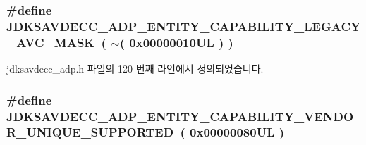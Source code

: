 \subsubsection[{\texorpdfstring{J\+D\+K\+S\+A\+V\+D\+E\+C\+C\+\_\+\+A\+D\+P\+\_\+\+E\+N\+T\+I\+T\+Y\+\_\+\+C\+A\+P\+A\+B\+I\+L\+I\+T\+Y\+\_\+\+L\+E\+G\+A\+C\+Y\+\_\+\+A\+V\+C\+\_\+\+M\+A\+SK}{JDKSAVDECC_ADP_ENTITY_CAPABILITY_LEGACY_AVC_MASK}}]{\setlength{\rightskip}{0pt plus 5cm}\#define J\+D\+K\+S\+A\+V\+D\+E\+C\+C\+\_\+\+A\+D\+P\+\_\+\+E\+N\+T\+I\+T\+Y\+\_\+\+C\+A\+P\+A\+B\+I\+L\+I\+T\+Y\+\_\+\+L\+E\+G\+A\+C\+Y\+\_\+\+A\+V\+C\+\_\+\+M\+A\+SK~( $\sim$( 0x00000010\+U\+L ) )}\hypertarget{group__adp__entity__capability_ga8db33e3f47f3ff827852028c167e78d0}{}\label{group__adp__entity__capability_ga8db33e3f47f3ff827852028c167e78d0}


jdksavdecc\+\_\+adp.\+h 파일의 120 번째 라인에서 정의되었습니다.

\subsubsection[{\texorpdfstring{J\+D\+K\+S\+A\+V\+D\+E\+C\+C\+\_\+\+A\+D\+P\+\_\+\+E\+N\+T\+I\+T\+Y\+\_\+\+C\+A\+P\+A\+B\+I\+L\+I\+T\+Y\+\_\+\+V\+E\+N\+D\+O\+R\+\_\+\+U\+N\+I\+Q\+U\+E\+\_\+\+S\+U\+P\+P\+O\+R\+T\+ED}{JDKSAVDECC_ADP_ENTITY_CAPABILITY_VENDOR_UNIQUE_SUPPORTED}}]{\setlength{\rightskip}{0pt plus 5cm}\#define J\+D\+K\+S\+A\+V\+D\+E\+C\+C\+\_\+\+A\+D\+P\+\_\+\+E\+N\+T\+I\+T\+Y\+\_\+\+C\+A\+P\+A\+B\+I\+L\+I\+T\+Y\+\_\+\+V\+E\+N\+D\+O\+R\+\_\+\+U\+N\+I\+Q\+U\+E\+\_\+\+S\+U\+P\+P\+O\+R\+T\+ED~( 0x00000080\+U\+L )}\hypertarget{group__adp__entity__capability_ga4aa351ae78ccd69934182279ed79d61f}{}\label{group__adp__entity__capability_ga4aa351ae78ccd69934182279ed79d61f}


